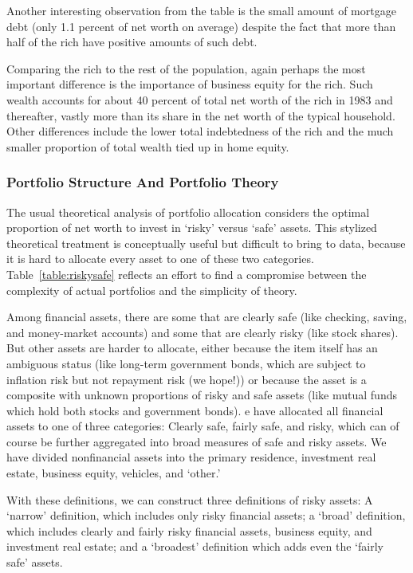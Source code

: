\documentclass[12pt]{article}
\begin{document}
Another interesting observation from the table is the small amount of
mortgage debt (only 1.1 percent of net worth on average) despite the fact
that more than half of the rich have positive amounts of such debt.

Comparing the rich to the rest of the population, again perhaps the most
important difference is the importance of business equity for the rich. Such
wealth accounts for about 40 percent of total net worth of the rich in 1983
and thereafter, vastly more than its share in the net worth of the typical
household. Other differences include the lower total indebtedness of the
rich and the much smaller proportion of total wealth tied up in home equity.

\subsubsection{Portfolio Structure And Portfolio Theory}

The usual theoretical analysis of portfolio allocation considers the optimal
proportion of net worth to invest in `risky' versus `safe' assets. This
stylized theoretical treatment is conceptually useful but difficult to bring
to data, because it is hard to allocate every asset to one of these two
categories. Table~\ref{table:riskysafe} reflects an effort to find a
compromise between the complexity of actual portfolios and the simplicity of
theory.

Among financial assets, there are some that are clearly safe (like checking,
saving, and money-market accounts) and some that are clearly risky (like
stock shares). But other assets are harder to allocate, either because the
item itself has an ambiguous status (like long-term government bonds, which
are subject to inflation risk but not repayment risk (we hope!)) or because
the asset is a composite with unknown proportions of risky and safe assets
(like mutual funds which hold both stocks and government bonds). %
e have allocated all financial assets to one of three
categories: Clearly safe, fairly safe, and risky, which can of course be
further aggregated into broad measures of safe and risky assets. We have
divided nonfinancial assets into the primary residence, investment real
estate, business equity, vehicles, and `other.'

With these definitions, we can construct three definitions of risky assets:
A `narrow' definition, which includes only risky financial assets; a `broad'
definition, which includes clearly and fairly risky financial assets,
business equity, and investment real estate; and a `broadest' definition
which adds even the `fairly safe' assets.
\end{document}
